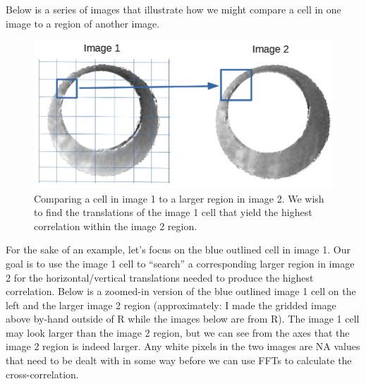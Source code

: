 \documentclass[]{book}
\begin{document}
Below is a series of images that illustrate how we might compare a cell in one image to a region of another image.

\begin{figure}

{\centering \includegraphics[width=0.5\linewidth]{images/cartridge_cases/im1_im2_cellComparison} 

}

\caption{Comparing a cell in image 1 to a larger region in image 2. We wish to find the translations of the image 1 cell that yield the highest correlation within the image 2 region.}\label{fig:unnamed-chunk-15}
\end{figure}

For the sake of an example, let's focus on the blue outlined cell in image 1. Our goal is to use the image 1 cell to ``search'' a corresponding larger region in image 2 for the horizontal/vertical translations needed to produce the highest correlation. Below is a zoomed-in version of the blue outlined image 1 cell on the left and the larger image 2 region (approximately: I made the gridded image above by-hand outside of R while the images below are from R). The image 1 cell may look larger than the image 2 region, but we can see from the axes that the image 2 region is indeed larger. Any white pixels in the two images are NA values that need to be dealt with in some way before we can use FFTs to calculate the cross-correlation.
\end{document}
